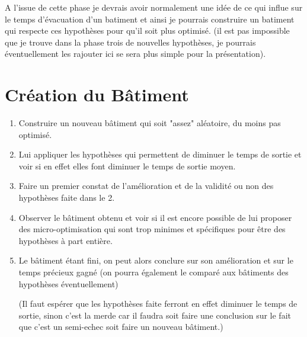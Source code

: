 \documentclass[12pt]{article}
\begin{document}
A l'issue de cette phase je devrais avoir normalement une idée de ce qui influe sur le temps d'évacuation d'un batiment
et ainsi je pourrais construire un batiment qui respecte ces hypothèses pour qu'il soit plus optimisé. (il est pas impossible que je trouve
dans la phase trois de nouvelles hypothèses, je pourrais éventuellement les rajouter ici se sera plus simple pour la présentation).

\section{Création du Bâtiment}

\begin{enumerate}
    \item Construire un nouveau bâtiment qui soit "assez" aléatoire, du moins pas optimisé.
    \item Lui appliquer les hypothèses qui permettent de diminuer le temps de sortie et voir si en effet elles font diminuer le temps de sortie moyen.
    \item Faire un premier constat de l'amélioration et de la validité ou non des hypothèses faite dans le 2.
    \item Observer le bâtiment obtenu et voir si il est encore possible de lui proposer des micro-optimisation qui sont trop minimes et spécifiques pour être des hypothèses à part entière.
    \item Le bâtiment étant fini, on peut alors conclure sur son amélioration et sur le temps précieux gagné (on pourra également le comparé aux bâtiments des hypothèses éventuellement)
    
    (Il faut espérer que les hypothèses faite ferront en effet diminuer le temps de sortie, sinon c'est la merde car il faudra soit faire une conclusion sur le fait que c'est un semi-echec
    soit faire un nouveau bâtiment.)
\end{enumerate}
\end{document}
